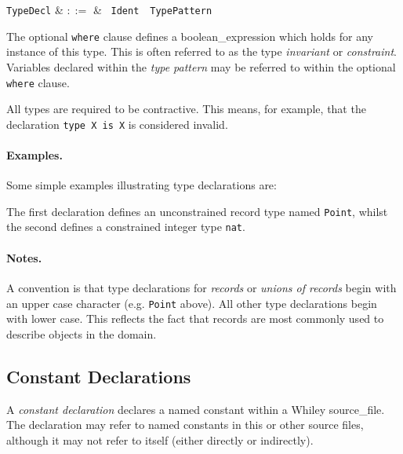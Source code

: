\begin{syntax}
  \verb+TypeDecl+ & $::=$ & \ \verb+Ident+\ \
  \verb+TypePattern+\ \\
\end{syntax}

The optional \lstinline{where} clause defines a \gls{boolean_expression} which holds for any instance of this type.  This is often referred to as the type {\em invariant} or {\em constraint}.  Variables declared within the {\em type pattern} may be referred to within the optional \lstinline{where} clause.  

All types are required to be \gls{contractive}.  This means, for example, that the declaration \lstinline+type X is X+ is considered invalid.

\paragraph{Examples.}  Some simple examples illustrating type
declarations are:



The first declaration defines an unconstrained record type named \lstinline{Point}, whilst the second defines a constrained integer type \lstinline{nat}.

\paragraph{Notes.}  A convention is that type declarations for {\em records} or {\em unions of records} begin with an upper case character (e.g. \lstinline{Point} above).  All other type declarations begin with lower case.  This reflects the fact that records are most commonly used to describe objects in the domain.


\subsection{Constant Declarations}
\label{c_source_files_constant_decl}

A {\em constant declaration} declares a named constant within a Whiley \gls{source_file}.  The declaration may refer to named constants in this or other source files, although it may not refer to itself (either directly or indirectly).

